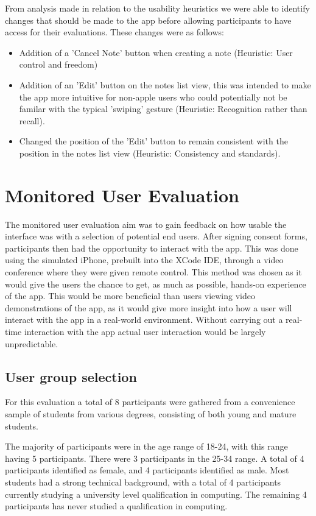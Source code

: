 \documentclass{l4proj}
\begin{document}
From analysis made in relation to the usability heuristics we were able to identify changes that should be made to the app before allowing participants to have access for their evaluations. These changes were as follows:
\begin{itemize}
    \item Addition of a 'Cancel Note' button when creating a note (Heuristic: User control and freedom)
    \item Addition of an 'Edit' button on the notes list view, this was intended to make the app more intuitive for non-apple users who could potentially not be familar with the typical 'swiping' gesture (Heuristic: Recognition rather than recall).
    \item Changed the position of the 'Edit' button to remain consistent with the position in the notes list view (Heuristic: Consistency and standards).
\end{itemize}

\section{Monitored User Evaluation}

The monitored user evaluation aim was to gain feedback on how usable the interface was with a selection of potential end users. After signing consent forms, participants then had the opportunity to interact with the app. This was done using the simulated iPhone, prebuilt into the XCode IDE, through a video conference where they were given remote control. This method was chosen as it would give the users the chance to get, as much as possible, hands-on experience of the app. This would be more beneficial than users viewing video demonstrations of the app, as it would give more insight into how a user will interact with the app in a real-world environment. Without carrying out a real-time interaction with the app actual user interaction would be largely unpredictable. 

\subsection{User group selection}

For this evaluation a total of 8 participants were gathered from a convenience sample of students from various degrees, consisting of both young and mature students. 

The majority of participants were in the age range of 18-24, with this range having 5 participants. There were 3 participants in the 25-34 range. A total of 4 participants identified as female, and 4 participants identified as male. Most students had a strong technical background, with a total of 4 participants currently studying a university level qualification in computing. The remaining 4 participants has never studied a qualification in computing.
\end{document}
